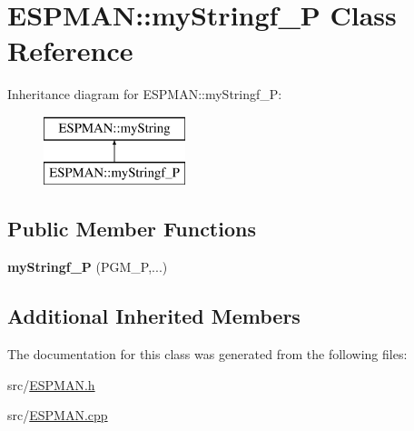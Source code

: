 \hypertarget{class_e_s_p_m_a_n_1_1my_stringf___p}{}\section{E\+S\+P\+M\+AN\+:\+:my\+Stringf\+\_\+P Class Reference}
\label{class_e_s_p_m_a_n_1_1my_stringf___p}
Inheritance diagram for E\+S\+P\+M\+AN\+:\+:my\+Stringf\+\_\+P\+:\begin{figure}[H]
\begin{center}
\leavevmode
\includegraphics[height=2.000000cm]{class_e_s_p_m_a_n_1_1my_stringf___p}
\end{center}
\end{figure}
\subsection*{Public Member Functions}
\begin{DoxyCompactItemize}
\item 
\mbox{\label{class_e_s_p_m_a_n_1_1my_stringf___p_acbb36a46a80ac34817f50747970912c1}} 
{\bfseries my\+Stringf\+\_\+P} (P\+G\+M\+\_\+P,...)
\end{DoxyCompactItemize}
\subsection*{Additional Inherited Members}


The documentation for this class was generated from the following files\+:\begin{DoxyCompactItemize}
\item 
src/\hyperlink{_e_s_p_m_a_n_8h}{E\+S\+P\+M\+A\+N.\+h}\item 
src/\hyperlink{_e_s_p_m_a_n_8cpp}{E\+S\+P\+M\+A\+N.\+cpp}\end{DoxyCompactItemize}
